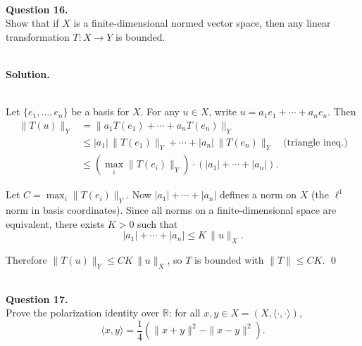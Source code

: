 \documentclass{article}
\newcommand{\RR}{\mathbb{R}}
\newcommand{\ip}[2]{\langle #1, #2 \rangle}
\begin{document}
\bigskip


\hfill \break  $~\!\!$ \dotfill \medskip \\
\textbf{Question 16.}\\
Show that if $X$ is a finite-dimensional normed vector space, then any linear transformation $T: X \to Y$ is bounded.

\noindent\\
\textbf{Solution.}\\
\quad\\
\begin{mdframed}[linewidth=1pt]
Let $\{e_1, \dots, e_n\}$ be a basis for $X$. For any $u \in X$, write $u = a_1 e_1 + \cdots + a_n e_n$. Then
\begin{align*}
\|T(u)\|_Y &= \|a_1 T(e_1) + \cdots + a_n T(e_n)\|_Y \\
&\le |a_1|\,\|T(e_1)\|_Y + \cdots + |a_n|\,\|T(e_n)\|_Y \quad \text{(triangle ineq.)} \\
&\le \left(\max_i \|T(e_i)\|_Y\right) \cdot (|a_1| + \cdots + |a_n|).
\end{align*}

Let $C = \max_i \|T(e_i)\|_Y$. Now $|a_1| + \cdots + |a_n|$ defines a norm on $X$ (the $\ell^1$ norm in basis coordinates). Since all norms on a finite-dimensional space are equivalent, there exists $K > 0$ such that
\[
|a_1| + \cdots + |a_n| \le K\, \|u\|_X.
\]

Therefore $\|T(u)\|_Y \le CK\, \|u\|_X$, so $T$ is bounded with $\|T\| \le CK$. \qed
\end{mdframed}

\bigskip


\hfill \break  $~\!\!$ \dotfill \medskip \\
\textbf{Question 17.}\\
Prove the polarization identity over $\RR$: for all $x, y \in X = (X, \ip{\cdot}{\cdot})$,
\[
\ip{x}{y} = \frac{1}{4}\left(\|x+y\|^2 - \|x-y\|^2\right).
\]
\end{document}
